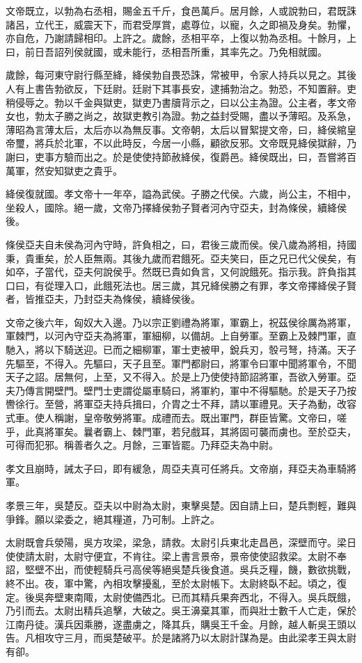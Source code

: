 文帝既立，以勃為右丞相，賜金五千斤，食邑萬戶。居月餘，人或說勃曰，君既誅諸呂，立代王，威震天下，而君受厚賞，處尊位，以寵，久之即禍及身矣。勃懼，亦自危，乃謝請歸相印。上許之。歲餘，丞相平卒，上復以勃為丞相。十餘月，上曰，前日吾詔列侯就國，或未能行，丞相吾所重，其率先之。乃免相就國。

歲餘，每河東守尉行縣至絳，絳侯勃自畏恐誅，常被甲，令家人持兵以見之。其後人有上書告勃欲反，下廷尉。廷尉下其事長安，逮捕勃治之。勃恐，不知置辭。吏稍侵辱之。勃以千金與獄吏，獄吏乃書牘背示之，曰以公主為證。公主者，孝文帝女也，勃太子勝之尚之，故獄吏教引為證。勃之益封受賜，盡以予薄昭。及系急，薄昭為言薄太后，太后亦以為無反事。文帝朝，太后以冒絮提文帝，曰，絳侯綰皇帝璽，將兵於北軍，不以此時反，今居一小縣，顧欲反邪。文帝既見絳侯獄辭，乃謝曰，吏事方驗而出之。於是使使持節赦絳侯，復爵邑。絳侯既出，曰，吾嘗將百萬軍，然安知獄吏之貴乎。

絳侯復就國。孝文帝十一年卒，謚為武侯。子勝之代侯。六歲，尚公主，不相中，坐殺人，國除。絕一歲，文帝乃擇絳侯勃子賢者河內守亞夫，封為條侯，續絳侯後。

條侯亞夫自未侯為河內守時，許負相之，曰，君後三歲而侯。侯八歲為將相，持國秉，貴重矣，於人臣無兩。其後九歲而君餓死。亞夫笑曰，臣之兄已代父侯矣，有如卒，子當代，亞夫何說侯乎。然既已貴如負言，又何說餓死。指示我。許負指其口曰，有從理入口，此餓死法也。居三歲，其兄絳侯勝之有罪，孝文帝擇絳侯子賢者，皆推亞夫，乃封亞夫為條侯，續絳侯後。

文帝之後六年，匈奴大入邊。乃以宗正劉禮為將軍，軍霸上，祝茲侯徐厲為將軍，軍棘門，以河內守亞夫為將軍，軍細柳，以備胡。上自勞軍。至霸上及棘門軍，直馳入，將以下騎送迎。已而之細柳軍，軍士吏被甲，銳兵刃，彀弓弩，持滿。天子先驅至，不得入。先驅曰，天子且至。軍門都尉曰，將軍令曰軍中聞將軍令，不聞天子之詔。居無何，上至，又不得入。於是上乃使使持節詔將軍，吾欲入勞軍。亞夫乃傳言開壁門。壁門士吏謂從屬車騎曰，將軍約，軍中不得驅馳。於是天子乃按轡徐行。至營，將軍亞夫持兵揖曰，介胄之士不拜，請以軍禮見。天子為動，改容式車。使人稱謝，皇帝敬勞將軍。成禮而去。既出軍門，群臣皆驚。文帝曰，嗟乎，此真將軍矣。曩者霸上、棘門軍，若兒戲耳，其將固可襲而虜也。至於亞夫，可得而犯邪。稱善者久之。月餘，三軍皆罷。乃拜亞夫為中尉。

孝文且崩時，誡太子曰，即有緩急，周亞夫真可任將兵。文帝崩，拜亞夫為車騎將軍。

孝景三年，吳楚反。亞夫以中尉為太尉，東擊吳楚。因自請上曰，楚兵剽輕，難與爭鋒。願以梁委之，絕其糧道，乃可制。上許之。

太尉既會兵滎陽，吳方攻梁，梁急，請救。太尉引兵東北走昌邑，深壁而守。梁日使使請太尉，太尉守便宜，不肯往。梁上書言景帝，景帝使使詔救梁。太尉不奉詔，堅壁不出，而使輕騎兵弓高侯等絕吳楚兵後食道。吳兵乏糧，饑，數欲挑戰，終不出。夜，軍中驚，內相攻擊擾亂，至於太尉帳下。太尉終臥不起。頃之，復定。後吳奔壁東南陬，太尉使備西北。已而其精兵果奔西北，不得入。吳兵既餓，乃引而去。太尉出精兵追擊，大破之。吳王濞棄其軍，而與壯士數千人亡走，保於江南丹徒。漢兵因乘勝，遂盡虜之，降其兵，購吳王千金。月餘，越人斬吳王頭以告。凡相攻守三月，而吳楚破平。於是諸將乃以太尉計謀為是。由此梁孝王與太尉有卻。

